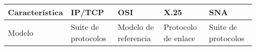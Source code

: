\newpage
\begingroup
\renewcommand*{\arraystretch}{1.5}
\small %
\begin{longtable}{|>{\raggedright\arraybackslash}m{2.4cm}|>{\raggedright\arraybackslash}m{2.8cm}|>{\raggedright\arraybackslash}m{2.8cm}|>{\raggedright\arraybackslash}m{2.8cm}|>{\raggedright\arraybackslash}m{2.8cm}|}
      \hline
      \textbf{Característica} & \textbf{IP/TCP}                                                                                                                                                                        & \textbf{OSI}                                                                                                                                                                                                                                         & \textbf{X.25}                                                                                                                                                                                                                                                                                                                                                                    & \textbf{SNA}                                                                                                                                                                                                                                                                           \\ \hline
      Modelo                  & Suite de protocolos                                                                                                                                                                    & Modelo de referencia                                                                                                                                                                                                                                 & Protocolo de enlace                                                                                                                                                                                                                                                                                                                                                              & Suite de protocolos                                                                                                                                                                                                                                                                    \\ \hline

\end{longtable}
